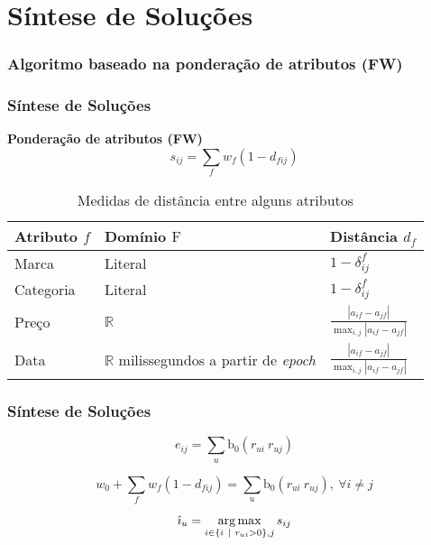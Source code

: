 \section[Síntese de Soluções]{Síntese de Soluções}
\subsubsection{Algoritmo baseado na ponderação de atributos (FW)} %
\label{ssub:algoritmo_baseado_na_pondera_o_de_atributos_fw_}
\begin{frame}
\frametitle{Síntese de Soluções}
\textbf{Ponderação de atributos (FW)}
\begin{equation} 
\label{eq:sij}
    s_{ij} = \sum_{f}{w_{f} \left(1-d_{fij}\right)}
\end{equation}


\begin{table}[hp]
\begin{center}
    \caption{Medidas de distância entre alguns atributos}
    \label{tab:medidas-distancia}
    \begin{tabular}{  | p{3cm} | p{3cm} | p{3cm} | } 
    \hline
    \textbf{Atributo} $f$ & \textbf{Domínio} $\mathrm{F}$ & \textbf{Distância} $d_f$ \\ \hline
    Marca & Literal & $1-\delta^f_{ij}$ \\ \hline    
    Categoria & Literal & $1-\delta^f_{ij}$ \\ \hline
    Preço & $\mathbb{R}$ & $ \frac{\left| a_{if}-a_{jf} \right|}{\max_{i,j}{\left| a_{if}-a_{jf} \right|}} $ \\ \hline
    Data & $\mathbb{R}$ milissegundos a partir de \textit{epoch} \cite{epoch} & $ \frac{\left| a_{if}-a_{jf} \right|}{\max_{i,j}{\left| a_{if}-a_{jf} \right|}} $ \\ \hline
    \end{tabular}
\end{center}
\end{table}
\end{frame}


\begin{frame}
\frametitle{Síntese de Soluções}

\begin{equation}
\label{eq:determinacao-eij} 
    e_{ij} = \sum_{u}{\mathrm{b_0}\left(r_{ui} ~ r_{uj}\right)}
\end{equation} 

\begin{equation}
\label{eq:determinacao-wf} 
    w_0 + \sum_{f}{w_{f}  \left(1-d_{fij}\right)} = \sum_{u}{\mathrm{b_0}\left(r_{ui} ~ r_{uj}\right)},~\forall i \neq j 
\end{equation} 

\begin{equation}
\label{eq:ifw} 
    \hat{\imath}_u = \operatorname*{arg\,max}_{i \in \left\{i~|~r_{ui} > 0\right\}, j}{s_{ij}}
\end{equation} 
\end{frame}


